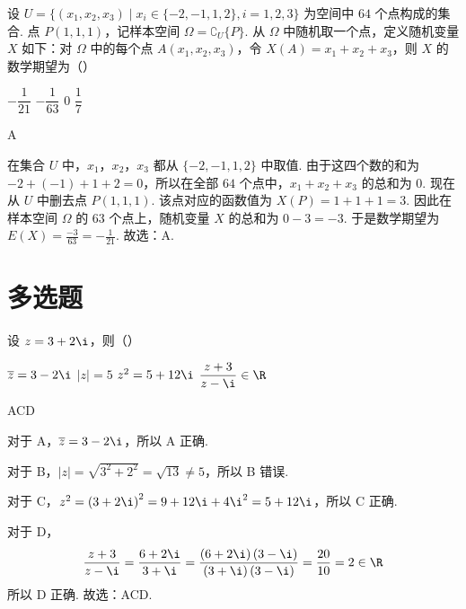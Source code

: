 \begin{problem}
设 \(U=\{(x_1,x_2,x_3)\mid x_i\in\{-2,-1,1,2\},i=1,2,3\}\) 为空间中 \(64\) 个点构成的集合. 点 \(P(1,1,1)\)，记样本空间 \(\Omega=\complement_U \{P\}\). 从 \(\Omega\) 中随机取一个点，定义随机变量 \(X\) 如下：对 \(\Omega\) 中的每个点 \(A(x_1,x_2,x_3)\)，令 \(X(A)=x_1+x_2+x_3\)，则 \(X\) 的数学期望为（\quad）

\choices
    {\(-\dfrac{1}{21}\)}
    {\(-\dfrac{1}{63}\)}
    {\(0\)}
    {\(\dfrac{1}{7}\)}
\end{problem}

\begin{answer}
A
\end{answer}

\begin{solution}
在集合 \(U\) 中，\(x_1\)，\(x_2\)，\(x_3\) 都从 \(\{-2,-1,1,2\}\) 中取值. 由于这四个数的和为 \(-2+(-1)+1+2=0\)，所以在全部 \(64\) 个点中，\(x_1+x_2+x_3\) 的总和为 \(0\).
现在从 \(U\) 中删去点 \(P(1,1,1)\). 该点对应的函数值为 \(X(P)=1+1+1=3\). 因此在样本空间 \(\Omega\) 的 \(63\) 个点上，随机变量 \(X\) 的总和为 \(0-3=-3\). 于是数学期望为 \(E(X)=\frac{-3}{63}=-\frac{1}{21}\). 故选：A.
\end{solution}
\section{多选题}

\begin{problem}
设 \(z=3+2\i\)，则（\quad）

\choices
    {\(\overline{z}=3-2\i\)}
    {\(\lvert z \rvert=5\)}
    {\(z^2=5+12\i\)}
    {\(\dfrac{z+3}{z-\i}\in\R\)}
\end{problem}

\begin{answer}
ACD
\end{answer}

\begin{solution}
对于 A，\(\overline{z}=3-2\i\)，所以 A 正确.

对于 B，\(\lvert z \rvert=\sqrt{3^2+2^2}=\sqrt{13}\ne 5\)，所以 B 错误.

对于 C，\(z^2=\left( 3+2\i \right)^2=9+12\i+4\i^2=5+12\i\)，所以 C 正确.

对于 D，
\[
\frac{z+3}{z-\i}=\frac{6+2\i}{3+\i}=\frac{\left( 6+2\i \right)\left( 3-\i \right)}{\left( 3+\i \right)\left( 3-\i \right)}=\frac{20}{10}=2\in\R
\]
所以 D 正确.
故选：ACD.
\end{solution}

